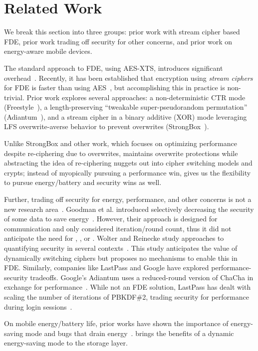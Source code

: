 \section{Related Work}\label{sec:related}

We break this section into three groups: prior work with stream cipher based
FDE, prior work trading off security for other concerns, and prior work on
energy-aware mobile devices.

 The standard approach to FDE, using AES-XTS,
introduces significant overhead~\cite{AESItself}. Recently, it has been
established that encryption using {\em stream ciphers} for FDE is faster than
using AES~\cite{StrongBox}, but accomplishing this in practice is non-trivial.
Prior work explores several approaches: a non-deterministic CTR mode
(Freestyle~\cite{Freestyle}), a length-preserving ``tweakable super-pseudorandom
permutation'' (Adiantum~\cite{Adiantum}), and a stream cipher in a binary
additive (XOR) mode leveraging LFS overwrite-averse behavior to prevent
overwrites (StrongBox~\cite{StrongBox}).

Unlike StrongBox and other work, which focuses on optimizing performance despite
re-ciphering due to overwrites, \sys maintains overwrite protections while
abstracting the idea of re-ciphering nuggets out into cipher switching models
and crypts; instead of myopically pursuing a performance win, \sys gives us the
flexibility to pursue energy/battery and security wins as well.

 Further, trading off security for
energy, performance, and other concerns is not a new research
area~\cite{ScalableSecurity, WolterReinecke, ZengChow1, HaleemEtAl,
LiOmiecinski, Merkel4, Merkle3}. Goodman et al. introduced selectively
decreasing the security of some data to save energy~\cite{ScalableSecurity}.
However, their approach is designed for communication and only considered
iteration/round count, thus it did not anticipate the need for \sysA, \sysB, or
\sysC. Wolter and Reinecke study approaches to quantifying security in several
contexts~\cite{WolterReinecke}. This study anticipates the value of dynamically
switching ciphers but proposes no mechanisms to enable this in FDE. Similarly,
companies like LastPass and Google have explored performance-security tradeoffs.
Google's Adiantum uses a reduced-round version of ChaCha in exchange for
performance~\cite{Adiantum}. While not an FDE solution, LastPass has dealt with
scaling the number of iterations of PBKDF\#2, trading security for performance
during login sessions~\cite{LastPass}.

 On mobile energy/battery life, prior works
have shown the importance of energy-saving mode and bugs that drain
energy~\cite{energy-doctor, power-aware}. \sys brings the benefits of a dynamic
energy-saving mode to the storage layer.
